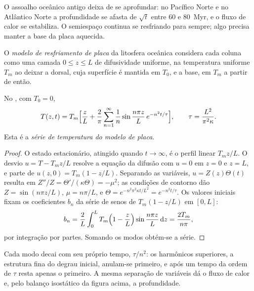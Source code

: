 O assoalho oceânico antigo deixa de se aprofundar: no Pacífico Norte e no Atlântico Norte a
profundidade se afasta de $\sqrt t$ entre 60 e \qty{80}{Myr}, e o fluxo de calor se
estabiliza. O semiespaço continua se resfriando para sempre; algo precisa manter a base da
placa aquecida.

\begin{definition}\label{def:b3:lithosphere-thermal-models:plate}
O \emph{modelo de resfriamento de placa} da
litosfera oceânica considera cada coluna como uma camada $0 \le z \le L$ de difusividade
uniforme, na temperatura uniforme $T_m$ ao deixar a dorsal, cuja
superfície é mantida em $T_0$, e a base, em $T_m$ a partir de então.
\end{definition}

\begin{theorem}\label{thm:b3:lithosphere-thermal-models:plate-series}
No , com $T_0 = 0$,
\[
  T(z, t) = T_m\Bigl[\frac zL + \frac2\pi\sum_{n=1}^\infty\frac1n
  \sin\frac{n\pi z}{L}\,e^{-n^2t/\tau}\Bigr],\qquad
  \tau = \frac{L^2}{\pi^2\kappa} .
\]
Esta é a \emph{série de temperatura do modelo de placa}.
\end{theorem}

\begin{proof}
O estado estacionário, atingido quando $t \to \infty$, é o perfil linear $T_mz/L$.
O desvio $u = T - T_mz/L$ resolve a equação da difusão com $u = 0$ em
$z = 0$ e $z = L$, e parte de $u(z, 0) = T_m(1 - z/L)$. Separando as
variáveis, $u = Z(z)\Theta(t)$ resulta em $Z''/Z = \Theta'/(\kappa\Theta) = -\mu^2$;
as condições de contorno dão $Z = \sin(n\pi z/L)$, $\mu = n\pi/L$, e
$\Theta = e^{-n^2\pi^2\kappa t/L^2} = e^{-n^2t/\tau}$. Os valores iniciais fixam os
coeficientes $b_n$ da série de senos de $T_m(1 - z/L)$ em $[0, L]$:
\[
  b_n = \frac2L\int_0^LT_m\Bigl(1 - \frac zL\Bigr)\sin\frac{n\pi z}{L}\,\mathrm dz
  = \frac{2T_m}{n\pi},
\]
por integração por partes. Somando os modos obtém-se a série.
\end{proof}

Cada modo decai com seu próprio tempo, $\tau/n^2$: os harmônicos superiores, a estrutura fina
do degrau inicial, anulam-se primeiro, e após um tempo da ordem de $\tau$
resta apenas o primeiro. A mesma separação de variáveis dá o fluxo de
calor e, pelo balanço isostático da figura acima, a profundidade.

